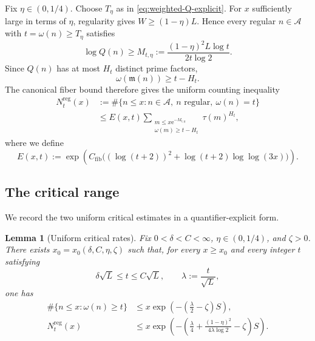 \documentclass[11pt]{amsart}
\newtheorem{lemma}[lemma]{Lemma}
\theoremstyle{definition}
\theoremstyle{remark}
\numberwithin{equation}{section}
\newcommand{\e}{\mathrm e}
\newcommand{\Acal}{\mathcal A}
\begin{document}
Fix $\eta\in(0,1/4)$.  Choose $T_\eta$ as in \eqref{eq:weighted-Q-explicit}.  For $x$ sufficiently large in terms of $\eta$, regularity gives $W\ge(1-\eta)L$.  Hence every regular $n\in\Acal$ with $t=\omega(n)\ge T_\eta$ satisfies
\begin{equation}\label{eq:Mt-def}
 \log Q(n)\ge M_{t,\eta}:=
 \frac{(1-\eta)^2L\log t}{2t\log 2}.
\end{equation}
Since $Q(n)$ has at most $H_t$ distinct prime factors,
\[
 \omega(\mathfrak m(n))\ge t-H_t.
\]
The canonical fiber bound therefore gives the uniform counting inequality
\begin{equation}\label{eq:compression-count}
 \begin{split}
 N_t^{\mathrm{reg}}(x)
 &:=\#\{n\le x:n\in\Acal,\ n\text{ regular},\ \omega(n)=t\}\\
 &\le E(x,t)
 \sum_{\substack{m\le x\e^{-M_{t,\eta}}\\
                   \omega(m)\ge t-H_t}}
 \tau(m)^{H_t},
 \end{split}
\end{equation}
where we define
\begin{equation}\label{eq:E-small}
 E(x,t):=\exp\!\left(C_{\mathrm{fib}}\bigl((\log(t+2))^2+
 \log(t+2)\log\log(3x)\bigr)\right).
\end{equation}
\subsection{The critical range}

We record the two uniform critical estimates in a quantifier-explicit form.

\begin{lemma}[Uniform critical rates]\label{lem:critical-rates}
Fix $0<\delta<C<\infty$, $\eta\in(0,1/4)$, and $\zeta>0$.  There exists $x_0=x_0(\delta,C,\eta,\zeta)$ such that, for every $x\ge x_0$ and every integer $t$ satisfying
\[
 \delta\sqrt L\le t\le C\sqrt L,
 \qquad
 \lambda:=\frac t{\sqrt L},
\]
one has
\begin{align}
 \#\{n\le x:\omega(n)\ge t\}
 &\le x\exp\!\left(-\left(\frac\lambda2-\zeta\right)S\right),
 \label{eq:ordinary-rate}\\
 N_t^{\mathrm{reg}}(x)
 &\le x\exp\!\left(-\left(\frac\lambda4+
 \frac{(1-\eta)^2}{4\lambda\log 2}-\zeta\right)S\right).
 \label{eq:compression-rate}
\end{align}
\end{lemma}
\end{document}
